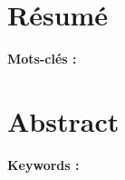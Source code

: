 \thispagestyle{empty}

\section*{Résumé}

{\bf Mots-clés :  }

\section*{Abstract}

{\bf Keywords : }
